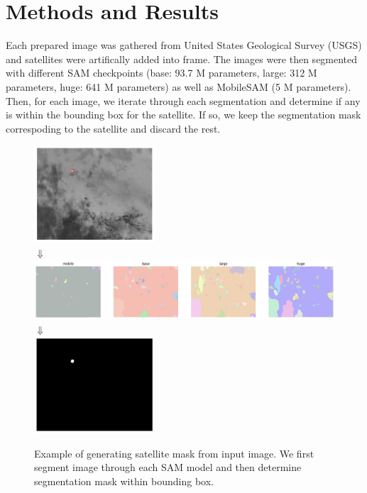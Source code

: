 \documentclass{article}
\begin{document}
\medskip

\section*{Methods and Results}

Each prepared image was gathered from United States Geological Survey (USGS) and satellites were artifically added into frame. The images were then segmented with different SAM checkpoints (base: 93.7 M parameters, large: 312 M parameters, huge: 641 M parameters) as well as MobileSAM (5 M parameters). Then, for each image, we iterate through each segmentation and determine if any is within the bounding box for the satellite. If so, we keep the segmentation mask correspoding to the satellite and discard the rest. 

\begin{figure}[H]
    \centering
    \includegraphics[width=0.4\textwidth]{figs/seg_img.png}\\
    $\Downarrow$\\
    \includegraphics[width=1\textwidth]{figs/seg_overlays.png}\\
    $\Downarrow$\\
    \includegraphics[width=0.4\textwidth]{figs/seg_mask.png}
    \captionsetup{width=.8\linewidth} 
    \caption{Example of generating satellite mask from input image. We first segment image through each SAM model and then determine segmentation mask within bounding box.}
\end{figure}
\end{document}
